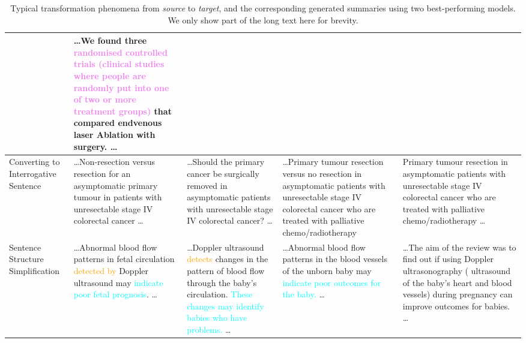 \documentclass[letterpaper, table]{article} %
\begin{document}
\begin{table*}[t!]
\begin{tabular}{@{}m{1.4cm}<{\centering}m{3.55cm}<{\centering}m{3.55cm}<{\centering}m{3.55cm}<{\centering}m{3.55cm}<{\centering} @{}}
& \ldots We found three \textcolor{violet}{randomised controlled trials (clinical studies where people are randomly put into one of two or more treatment groups)} that compared endvenous laser Ablation with surgery. \ldots
 \\ \midrule
Converting to Interrogative Sentence
& \ldots Non-resection versus resection for an asymptomatic primary tumour in patients with unresectable stage IV colorectal cancer \ldots \cite{cirocchi2012non}
& \ldots Should the primary cancer be surgically removed in asymptomatic patients with unresectable stage IV colorectal cancer? \ldots
& \ldots Primary tumour resection versus no resection in asymptomatic patients with unresectable stage IV colorectal cancer who are treated with palliative chemo/radiotherapy
& Primary tumour resection in asymptomatic patients with unresectable stage IV colorectal cancer who are treated with palliative chemo/radiotherapy \ldots
\\ \midrule
Sentence Structure Simplification
& \ldots Abnormal blood flow patterns in fetal circulation \textcolor{orange}{detected by} Doppler ultrasound may \textcolor{cyan}{indicate poor fetal prognosis}. \ldots \cite{alfirevic2017fetal}
& \ldots Doppler ultrasound \textcolor{orange}{detects} changes in the pattern of blood flow through the baby's circulation. \textcolor{cyan}{These changes may identify babies who have problems.} \ldots
& \ldots Abnormal blood flow patterns in the blood vessels of the unborn baby may \textcolor{cyan}{indicate poor outcomes for the baby.}  \ldots
& \ldots The aim of the review was to find out if using Doppler ultrasonography ( ultrasound of the baby's heart and blood vessels) during pregnancy can improve outcomes for babies. \ldots \\
\bottomrule
\end{tabular}
\caption{Typical transformation phenomena from \textit{source} to \textit{target}, and the corresponding generated summaries using two best-performing models. We only show part of the long text here for brevity.}
\label{transformation_case_study}

\end{table*}
\end{document}
